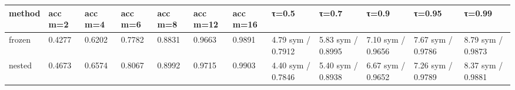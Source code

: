\begin{tabular}{llllllllllll}
\hline
method & acc m=2 & acc m=4 & acc m=6 & acc m=8 & acc m=12 & acc m=16 & τ=0.5 & τ=0.7 & τ=0.9 & τ=0.95 & τ=0.99 \\
\hline
frozen & 0.4277 & 0.6202 & 0.7782 & 0.8831 & 0.9663 & 0.9891 & 4.79 sym / 0.7912 & 5.83 sym / 0.8995 & 7.10 sym / 0.9656 & 7.67 sym / 0.9786 & 8.79 sym / 0.9873 \\
nested & 0.4673 & 0.6574 & 0.8067 & 0.8992 & 0.9715 & 0.9903 & 4.40 sym / 0.7846 & 5.40 sym / 0.8938 & 6.67 sym / 0.9652 & 7.26 sym / 0.9789 & 8.37 sym / 0.9881 \\
\hline
\end{tabular}
